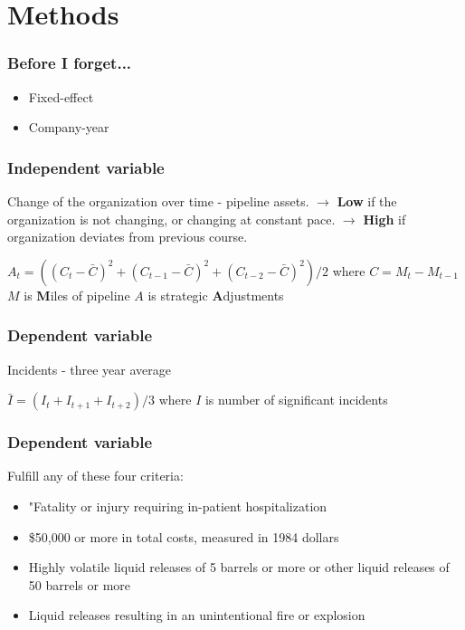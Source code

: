 \section{Methods}

\begin{frame}
	\frametitle{Before I forget...}
	\begin{itemize}
		\item Fixed-effect
		\item Company-year
	\end{itemize}
\end{frame}

\begin{frame}
	\frametitle{Independent variable}
	Change of the organization over time - pipeline assets.\smallbreak
	$\rightarrow$ \textbf{Low} if the organization is not changing, or changing at constant pace.\smallbreak
	$\rightarrow$ \textbf{High} if organization deviates from previous course.
	
	\hrulefill
	
	$A_{t} = ((C_{t} - \bar{C})^2 + (C_{t-1} - \bar{C})^2 + (C_{t-2} - \bar{C})^2) / 2$\smallbreak
	where\smallbreak
	$C = M_{t} - M_{t-1}$\smallbreak
	$M$ is \textbf{M}iles of pipeline\smallbreak
	$A$ is strategic \textbf{A}djustments\smallbreak
\end{frame}

\begin{frame}
	\frametitle{Dependent variable}
	Incidents - three year average
	
	\hrulefill
	
	$\bar{I} = (I_{t} + I_{t+1} + I_{t+2})/3$\smallbreak
	where\smallbreak
	$I$ is number of significant incidents
\end{frame}

\begin{frame}
	\frametitle{Dependent variable}
	Fulfill any of these four criteria:
	\begin{itemize}
		\item "Fatality or injury requiring in-patient hospitalization
		\item \$50,000 or more in total costs, measured in 1984 dollars
		\item Highly volatile liquid releases of 5 barrels or more or other liquid releases of 50 barrels or more
		\item Liquid releases resulting in an unintentional fire or explosion
	\end{itemize}
	\incidentDefinition
\end{frame}

